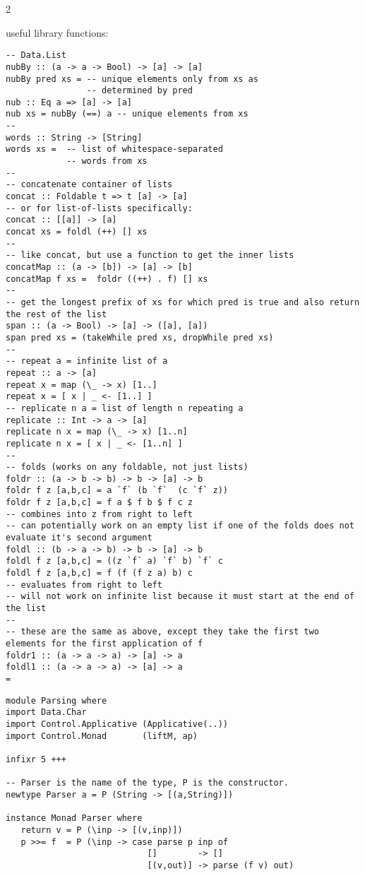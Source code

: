 \documentclass{article}
\def \columncount {2}
\begin{document}
\begin{multicols*}{\columncount}
\begin{outline}[longenum]
\0 useful library functions:
\begin{verbatim}
-- Data.List
nubBy :: (a -> a -> Bool) -> [a] -> [a]
nubBy pred xs = -- unique elements only from xs as 
                -- determined by pred
nub :: Eq a => [a] -> [a]
nub xs = nubBy (==) a -- unique elements from xs
-- 
words :: String -> [String]
words xs =  -- list of whitespace-separated 
            -- words from xs
--
-- concatenate container of lists
concat :: Foldable t => t [a] -> [a]
-- or for list-of-lists specifically:
concat :: [[a]] -> [a]
concat xs = foldl (++) [] xs
--
-- like concat, but use a function to get the inner lists
concatMap :: (a -> [b]) -> [a] -> [b]
concatMap f xs =  foldr ((++) . f) [] xs
-- 
-- get the longest prefix of xs for which pred is true and also return the rest of the list
span :: (a -> Bool) -> [a] -> ([a], [a])
span pred xs = (takeWhile pred xs, dropWhile pred xs)
-- 
-- repeat a = infinite list of a
repeat :: a -> [a]
repeat x = map (\_ -> x) [1..]
repeat x = [ x | _ <- [1..] ]
-- replicate n a = list of length n repeating a
replicate :: Int -> a -> [a]
replicate n x = map (\_ -> x) [1..n]
replicate n x = [ x | _ <- [1..n] ]
--
-- folds (works on any foldable, not just lists)
foldr :: (a -> b -> b) -> b -> [a] -> b
foldr f z [a,b,c] = a `f` (b `f`  (c `f` z))
foldr f z [a,b,c] = f a $ f b $ f c z
-- combines into z from right to left
-- can potentially work on an empty list if one of the folds does not evaluate it's second argument
foldl :: (b -> a -> b) -> b -> [a] -> b
foldl f z [a,b,c] = ((z `f` a) `f` b) `f` c
foldl f z [a,b,c] = f (f (f z a) b) c
-- evaluates from right to left
-- will not work on infinite list because it must start at the end of the list
-- 
-- these are the same as above, except they take the first two elements for the first application of f
foldr1 :: (a -> a -> a) -> [a] -> a
foldl1 :: (a -> a -> a) -> [a] -> a
= \end{verbatim}


\begin{verbatim}
module Parsing where
import Data.Char
import Control.Applicative (Applicative(..))
import Control.Monad       (liftM, ap)

infixr 5 +++

-- Parser is the name of the type, P is the constructor.
newtype Parser a = P (String -> [(a,String)])

instance Monad Parser where
   return v = P (\inp -> [(v,inp)])
   p >>= f  = P (\inp -> case parse p inp of
                            []        -> []
                            [(v,out)] -> parse (f v) out)


\end{verbatim}
\end{outline}
\end{multicols*}
\end{document}
